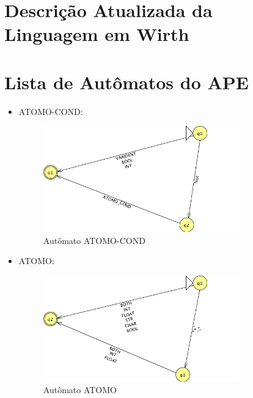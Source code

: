 
\section{Descrição Atualizada da Linguagem em Wirth}



\section{Lista de Autômatos do APE}

\begin{itemize}

	\item ATOMO-COND:
	\begin{figure}[H]
		\centering 
		\includegraphics[width=0.8\textwidth]{images/submaquinas/ATOMO-COND.png}  
		\caption{Autômato ATOMO-COND}
	\end{figure}
	
	\item ATOMO:
	\begin{figure}[H]
		\centering 
		\includegraphics[width=0.8\textwidth]{images/submaquinas/ATOMO.png}  
		\caption{Autômato ATOMO}
	\end{figure}
	

\end{itemize}
